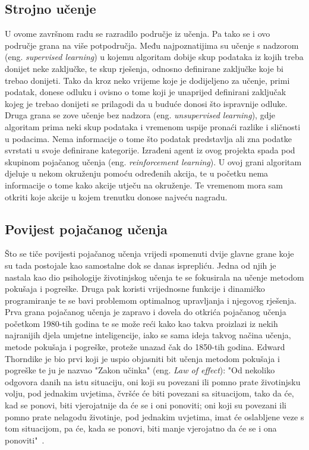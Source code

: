 \subsection{Strojno učenje}
U ovome završnom radu se razradilo područje iz učenja. Pa tako se i ovo područje grana na više potpodručja. Među najpoznatijima su učenje s nadzorom (eng. \textit{supervised learning}) u kojemu algoritam dobije skup podataka iz kojih treba donijet neke zaključke, te skup rješenja, odnosno definirane zaključke koje bi trebao donijeti. Tako da kroz neko vrijeme koje je dodijeljeno za učenje, primi podatak, donese odluku i ovisno 
o tome koji je unaprijed definirani zaključak kojeg je trebao donijeti se prilagodi da u buduće donosi što ispravnije odluke. Druga grana se zove učenje bez nadzora (eng. \textit{unsupervised learning}), gdje algoritam prima neki skup podataka i vremenom uspije pronaći razlike i sličnosti u podacima. Nema informacije o tome što podatak predstavlja ali zna podatke svrstati u svoje definirane kategorije. Izrađeni agent iz ovog projekta spada pod skupinom pojačanog učenja (eng. \textit{reinforcement learning}). U ovoj grani algoritam djeluje u nekom okruženju pomoću određenih akcija, te u početku nema informacije o tome kako akcije utječu na okruženje. Te vremenom mora sam otkriti koje akcije u kojem trenutku donose najveću nagradu.


\subsection{Povijest pojačanog učenja}
Što se tiče povijesti pojačanog učenja vrijedi spomenuti dvije glavne grane koje su tada postojale kao samostalne dok se danas isprepliću. Jedna od njih je nastala kao dio psihologije životinjskog učenja te se fokusirala na učenje metodom pokušaja i pogreške. Druga pak koristi vrijednosne funkcije i dinamičko programiranje te se bavi problemom optimalnog upravljanja i njegovog rješenja. Prva grana pojačanog učenja je zapravo i dovela do otkrića pojačanog učenja početkom 1980-tih godina te se može reći kako kao takva proizlazi iz nekih najranijih djela umjetne inteligencije, iako se sama ideja takvog načina učenja, metode pokušaja i pogreške, proteže unazad čak do 1850-tih godina. Edward Thorndike je bio prvi koji je uspio objasniti bit učenja metodom pokušaja i pogreške te ju je nazvao "Zakon učinka" (eng. \textit{Law of effect}): "Od nekoliko odgovora danih na istu situaciju, oni koji su povezani ili pomno prate životinjsku volju, pod jednakim uvjetima, čvršće će biti povezani sa situacijom, tako da će, kad se ponovi, biti vjerojatnije da će se i oni ponoviti; oni koji su povezani ili pomno prate nelagodu životinje, pod jednakim uvjetima, imat će oslabljene veze s tom situacijom, pa će, kada se ponovi, biti manje vjerojatno da će se i ona ponoviti"~\cite{reinforcement_learning}.

